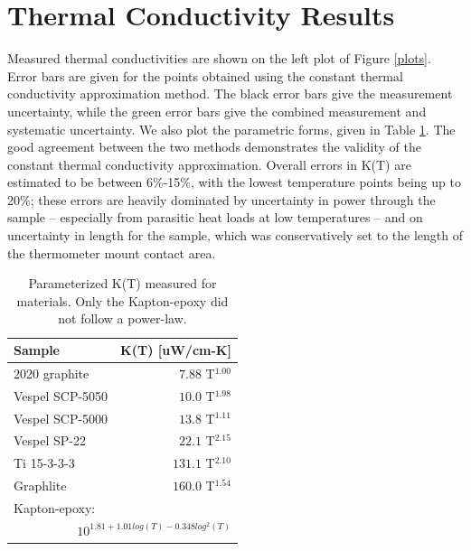 \documentclass[final]{svjour2}
\begin{document}
\section{Thermal Conductivity Results}
Measured thermal conductivities are shown on the left plot of Figure \ref{plots}. Error bars are given for the points obtained using the constant thermal conductivity approximation method. The black error bars give the measurement uncertainty, while the green error bars give the combined measurement and systematic uncertainty. We also plot the parametric forms, given in Table \ref{cond_table}. The good agreement between the two methods demonstrates the validity of the constant thermal conductivity approximation. Overall errors in K(T) are estimated to be between 6\%-15\%, with the lowest temperature points being up to 20\%; these errors are heavily dominated by uncertainty in power through the sample -- especially from parasitic heat loads at low temperatures -- and on uncertainty in length for the sample, which was conservatively set to the length of the thermometer mount contact area.

\begin{table}
\centering
\small
\begin{threeparttable}
\begin{tabular}{lr}
\toprule
Sample & K(T) [uW/cm-K] \\
\midrule
2020 graphite & $7.88$ T$^{1.00}$ \\
Vespel SCP-5050 & $10.0$ T$^{1.98}$ \\
Vespel SCP-5000 & $13.8$ T$^{1.11}$ \\
Vespel SP-22 & $22.1$ T$^{2.15}$ \\
Ti 15-3-3-3 & $131.1$ T$^{2.10}$ \\
Graphlite & $160.0$ T$^{1.54}$ \\
Kapton-epoxy: & \\
\multicolumn{2}{r}{$10^{1.81 + 1.01log(T) - 0.348log^2(T)}$} \\
\bottomrule
\end{tabular}
\caption{{\small Parameterized K(T) measured for materials. Only the Kapton-epoxy did not follow a power-law.}}
\label{cond_table}
\end{threeparttable}
\end{table}
\end{document}
